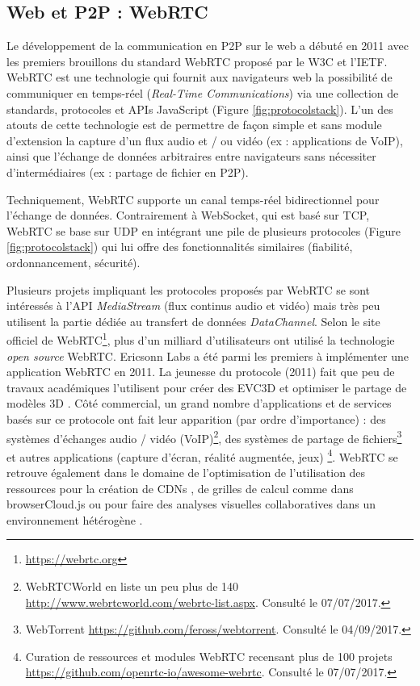 \subsection{Web et P2P : WebRTC}
\label{sec:webrtc}
Le développement de la communication en \gls{P2P} sur le web a 
débuté en 2011 avec les premiers brouillons du standard \gls{WebRTC} proposé 
par le \gls{W3C} et l'\gls{IETF}\textsuperscript{\textregistered}. 
\gls{WebRTC} est une technologie qui fournit aux navigateurs web la possibilité de 
communiquer en temps-réel (\textit{Real-Time Communications}) via une collection 
de standards, protocoles et \glspl{API} JavaScript (Figure \ref{fig:protocolstack}). 
L'un des atouts de cette technologie est de permettre de façon simple et 
sans module d'extension la capture d'un flux audio et / ou vidéo (ex : 
applications de VoIP), ainsi que l'échange de données arbitraires entre 
navigateurs sans nécessiter d'intermédiaires (ex : partage de fichier en 
P2P).


Techniquement, \gls{WebRTC} supporte un canal temps-réel 
bidirectionnel pour l'échange de données. Contrairement à 
\gls{WebSocket}, qui est basé sur \gls{TCP}, \gls{WebRTC} se base sur 
\acrshort{UDP} en intégrant une pile de plusieurs protocoles (Figure 
\ref{fig:protocolstack}) qui lui offre des fonctionnalités similaires (fiabilité, 
ordonnancement, sécurité). 


Plusieurs projets impliquant les protocoles proposés par \gls{WebRTC} 
se sont intéressés à l'\gls{API} \textit{MediaStream} (flux continus audio 
et vidéo) mais très peu utilisent la partie dédiée au transfert de données 
\textit{DataChannel}. 
Selon le site officiel de WebRTC\footnote{\url{https://webrtc.org}}, plus d'un milliard 
d'utilisateurs ont utilisé la technologie \textit{open source} WebRTC. Ericsonn Labs 
a été parmi les premiers à implémenter une application WebRTC en 2011. 
La jeunesse du protocole (2011) fait que peu de travaux académiques 
l'utilisent pour créer des \gls{EVC3D} \cite{Desprat2015a,Steiakaki2016} et 
optimiser le partage de modèles \gls{3D} \cite{Koskela2014}. 
Côté commercial, un grand nombre d'applications et de services 
basés sur ce protocole ont fait leur apparition (par ordre d'importance) : 
des systèmes d'échanges audio / vidéo (VoIP)\footnote{WebRTCWorld en 
	liste un peu plus de 140 
	\url{http://www.webrtcworld.com/webrtc-list.aspx}. Consulté le 
	07/07/2017.}, des systèmes de partage de fichiers\footnote{WebTorrent 
	\url{https://github.com/feross/webtorrent}. Consulté le 04/09/2017.} et 
autres applications (capture d'écran, réalité augmentée, jeux)
\footnote{Curation de ressources et modules WebRTC 
	recensant plus de 100 projets 
	\url{https://github.com/openrtc-io/awesome-webrtc}. Consulté le 
	07/07/2017.}. WebRTC se retrouve également dans le domaine de l'optimisation 
	de l'utilisation des ressources pour la création de \glspl{CDN} 
	\cite{Zhang2013b}, de grilles de calcul comme dans
	browserCloud.js \cite{Dias2015a} ou pour faire des analyses visuelles 
	collaboratives dans un environnement hétérogène \cite{Li2015}.


